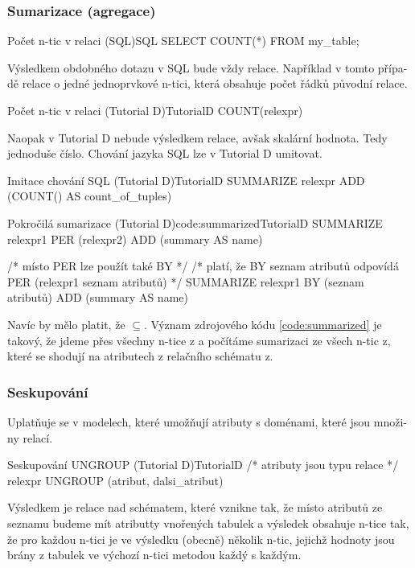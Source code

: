 \subsubsection{Sumarizace (agregace)}
\begin{upcode}{Počet n-tic v relaci (SQL)}{}{SQL}
SELECT COUNT(*) FROM my_table;
\end{upcode}
Výsledkem obdobného dotazu v SQL bude vždy relace. Například v tomto přípa-dě relace o jedné jednoprvkové n-tici, která obsahuje počet řádků původní relace.
\begin{upcode}{Počet n-tic v relaci (Tutorial D)}{}{TutorialD}
COUNT(relexpr)
\end{upcode}
Naopak v Tutorial D nebude výsledkem relace, avšak skalární hodnota. Tedy jednoduše číslo. Chování jazyka SQL lze v Tutorial D umitovat.
\begin{upcode}{Imitace chování SQL (Tutorial D)}{}{TutorialD}
SUMMARIZE relexpr ADD (COUNT() AS count_of_tuples)
\end{upcode}
\begin{upcode}{Pokročilá sumarizace (Tutorial D)}{code:summarized}{TutorialD}
SUMMARIZE relexpr1
PER (relexpr2)
ADD (summary AS name)

/* místo PER lze použít také BY */
/* platí, že BY {seznam atributů} odpovídá PER (relexpr1 {seznam atributů}) */
SUMMARIZE relexpr1
BY (seznam atributů)
ADD (summary AS name)
\end{upcode}
Navíc by mělo platit, že $\subseteq$. Význam zdrojového kódu \ref{code:summarized} je takový, že jdeme přes všechny n-tice z a počítáme sumarizaci ze všech n-tic z, které se shodují na atributech z relačního schématu z.

\subsubsection{Seskupování}
Uplatňuje se v modelech, které umožňují atributy s doménami, které jsou množi-ny relací.

\begin{upcode}{Seskupování UNGROUP (Tutorial D)}{}{TutorialD}
/* atributy jsou typu relace */
relexpr UNGROUP (atribut, dalsi_atribut)
\end{upcode}
Výsledkem je relace nad schématem, které vznikne tak, že místo atributů ze seznamu budeme mít atributty vnořených tabulek a výsledek obsahuje n-tice tak, že pro každou n-tici je ve výsledku (obecně) několik n-tic, jejichž hodnoty jsou brány z tabulek ve výchozí n-tici metodou každý s každým.


